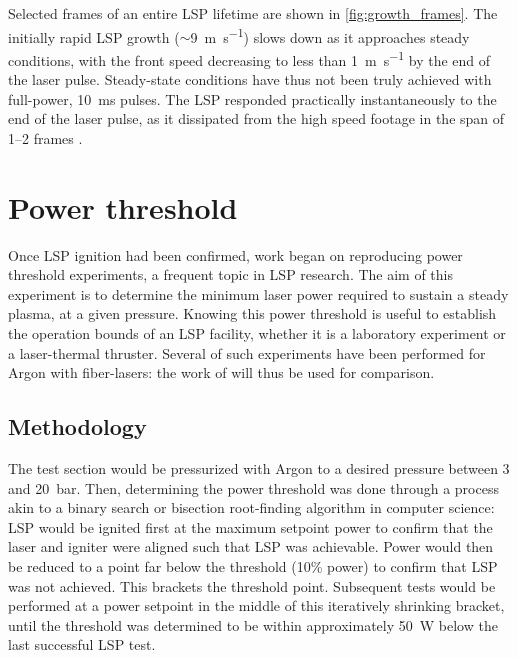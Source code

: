             

            Selected frames of an entire LSP lifetime are shown in \autoref{fig:growth_frames}. The initially rapid LSP growth ($\sim$\qty{9}{m.s^{-1}}) slows down as it approaches steady conditions, with the front speed decreasing to less than \qty{1}{m.s^{-1}} by the end of the laser pulse. Steady-state conditions have thus not been truly achieved with full-power, \qty{10}{ms} pulses. The LSP responded practically instantaneously to the end of the laser pulse, as it dissipated from the high speed footage in the span of 1--2 frames .
            
            
    \clearpage
    \section{Power threshold} \label{sec:results_powerthreshold}
        Once LSP ignition had been confirmed, work began on reproducing power threshold experiments, a frequent topic in LSP research. The aim of this experiment is to determine the minimum laser power required to sustain a steady plasma, at a given pressure. Knowing this power threshold is useful to establish the operation bounds of an LSP facility, whether it is a laboratory experiment or a laser-thermal thruster. Several of such experiments have been performed for Argon with fiber-lasers: the work of \textcite{zimakovInteractionNearIRLaser2016, matsuiGeneratingConditionsArgon2019,luCharacteristicDiagnosticsLaserStabilized2022} will thus be used for comparison.
        
        \subsection{Methodology}
            The test section would be pressurized with Argon to a desired pressure between 3 and 20~bar. Then, determining the power threshold was done through a process akin to a binary search or bisection root-finding algorithm in computer science: LSP would be ignited first at the maximum setpoint power to confirm that the laser and igniter were aligned such that LSP was achievable. Power would then be reduced to a point far below the threshold (10\% power) to confirm that LSP was not achieved. This brackets the threshold point. Subsequent tests would be performed at a power setpoint in the middle of this iteratively shrinking bracket, until the threshold was determined to be within approximately \qty{50}{W} below the last successful LSP test.

